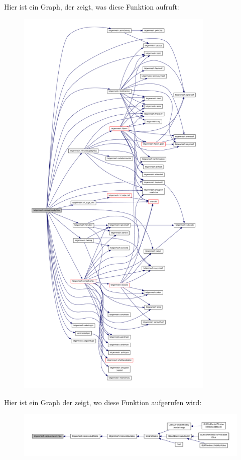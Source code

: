 Hier ist ein Graph, der zeigt, was diese Funktion aufruft\-:
\nopagebreak
\begin{figure}[H]
\begin{center}
\leavevmode
\includegraphics[height=550pt]{classtetgenmesh_a38c7fc92a1ced3f4885006837a83c2e6_cgraph}
\end{center}
\end{figure}




Hier ist ein Graph der zeigt, wo diese Funktion aufgerufen wird\-:
\nopagebreak
\begin{figure}[H]
\begin{center}
\leavevmode
\includegraphics[width=350pt]{classtetgenmesh_a38c7fc92a1ced3f4885006837a83c2e6_icgraph}
\end{center}
\end{figure}


